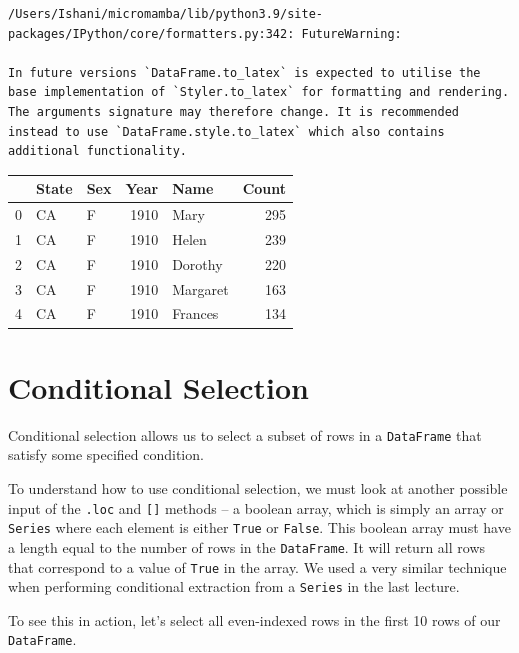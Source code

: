 \documentclass[
  letterpaper,
  DIV=11,
  numbers=noendperiod]{scrreprt}
\begin{document}
\begin{verbatim}
/Users/Ishani/micromamba/lib/python3.9/site-packages/IPython/core/formatters.py:342: FutureWarning:

In future versions `DataFrame.to_latex` is expected to utilise the base implementation of `Styler.to_latex` for formatting and rendering. The arguments signature may therefore change. It is recommended instead to use `DataFrame.style.to_latex` which also contains additional functionality.
\end{verbatim}

\begin{tabular}{lllrlr}
\toprule
{} & State & Sex &  Year &      Name &  Count \\
\midrule
0 &    CA &   F &  1910 &      Mary &    295 \\
1 &    CA &   F &  1910 &     Helen &    239 \\
2 &    CA &   F &  1910 &   Dorothy &    220 \\
3 &    CA &   F &  1910 &  Margaret &    163 \\
4 &    CA &   F &  1910 &   Frances &    134 \\
\bottomrule
\end{tabular}

\hypertarget{conditional-selection}{%
\section{Conditional Selection}\label{conditional-selection}}

Conditional selection allows us to select a subset of rows in a
\texttt{DataFrame} that satisfy some specified condition.

To understand how to use conditional selection, we must look at another
possible input of the \texttt{.loc} and \texttt{{[}{]}} methods -- a
boolean array, which is simply an array or \texttt{Series} where each
element is either \texttt{True} or \texttt{False}. This boolean array
must have a length equal to the number of rows in the
\texttt{DataFrame}. It will return all rows that correspond to a value
of \texttt{True} in the array. We used a very similar technique when
performing conditional extraction from a \texttt{Series} in the last
lecture.

To see this in action, let's select all even-indexed rows in the first
10 rows of our \texttt{DataFrame}.
\end{document}

